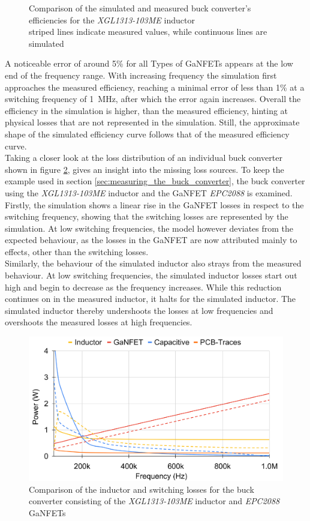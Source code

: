\begin{figure}[H]
\begin{subfigure}[b]{0.50\textwidth}
    \end{subfigure}
    \caption{Comparison of the simulated and measured buck converter's efficiencies for the \textit{XGL1313-103ME} inductor\\striped lines indicate measured values, while continuous lines are simulated}
    \label{fig:comparison_efficiencies_sim_and_meas}							
\end{figure}
A noticeable error of around 5\% for all Types of \acp{GaNFET} appears at the low end of the frequency range. With increasing frequency the simulation first approaches the measured efficiency, reaching a minimal error of less than 1\% at a switching frequency of \SI{1}{\mega\Hz}, after which the error again increases. Overall the efficiency in the simulation is higher, than the measured efficiency, hinting at physical losses that are not represented in the simulation. Still, the approximate shape of the simulated efficiency curve follows that of the measured efficiency curve.\\
Taking a closer look at the loss distribution of an individual buck converter shown in figure \ref{fig:xgl103_epc2088_loss_comparison}, gives an insight into the missing loss sources. To keep the example used in section \ref{sec:measuring_the_buck_converter}, the buck converter using the \textit{XGL1313-103ME} inductor and the \ac{GaNFET} \textit{EPC2088} is examined. Firstly, the simulation shows a linear rise in the \ac{GaNFET} losses in respect to the switching frequency, showing that the switching losses are represented by the simulation. At low switching frequencies, the model however deviates from the expected behaviour, as the losses in the \ac{GaNFET} are now attributed mainly to effects, other than the switching losses.\\
Similarly, the behaviour of the simulated inductor also strays from the measured behaviour. At low switching frequencies, the simulated inductor losses start out high and begin to decrease as the frequency increases. While this reduction continues on in the measured inductor, it halts for the simulated inductor. The simulated inductor thereby undershoots the losses at low frequencies and overshoots the measured losses at high frequencies.
\begin{figure}[H]
    \centering
    \includegraphics[width=0.75\linewidth]{Bilder/Kapitel4/XGL103_EPC2088_Simulation_Loss_Comparison.png}
    \caption{Comparison of the inductor and switching losses for the buck converter consisting of the \textit{XGL1313-103ME} inductor and \textit{EPC2088} \acp{GaNFET}}
    \label{fig:xgl103_epc2088_loss_comparison}
\end{figure}

